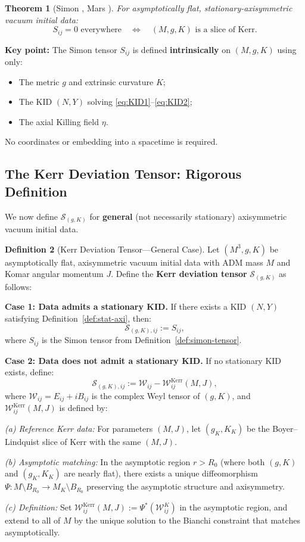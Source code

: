 \documentclass[12pt]{article}
\theoremstyle{plain}
\newtheorem{theorem}{Theorem}[section]
\theoremstyle{definition}
\newtheorem{definition}[theorem]{Definition}
\theoremstyle{remark}
\begin{document}
\begin{theorem}[Simon \cite{simon1984}, Mars \cite{mars1999}]\label{thm:simon-kerr}
For asymptotically flat, stationary-axisymmetric vacuum initial data:
\[
S_{ij} = 0 \text{ everywhere} \quad \Longleftrightarrow \quad (M, g, K) \text{ is a slice of Kerr}.
\]
\end{theorem}

\textbf{Key point:} The Simon tensor $S_{ij}$ is defined \textbf{intrinsically} on $(M, g, K)$ using only:
\begin{itemize}
    \item The metric $g$ and extrinsic curvature $K$;
    \item The KID $(N, Y)$ solving \eqref{eq:KID1}--\eqref{eq:KID2};
    \item The axial Killing field $\eta$.
\end{itemize}
No coordinates or embedding into a spacetime is required.

\subsection{The Kerr Deviation Tensor: Rigorous Definition}

We now define $\mathcal{S}_{(g,K)}$ for \textbf{general} (not necessarily stationary) axisymmetric vacuum initial data.

\begin{definition}[Kerr Deviation Tensor---General Case]\label{def:kerr-deviation-general}
Let $(M^3, g, K)$ be asymptotically flat, axisymmetric vacuum initial data with ADM mass $M$ and Komar angular momentum $J$. Define the \textbf{Kerr deviation tensor} $\mathcal{S}_{(g,K)}$ as follows:

\textbf{Case 1: Data admits a stationary KID.}
If there exists a KID $(N, Y)$ satisfying Definition~\ref{def:stat-axi}, then:
\[
\mathcal{S}_{(g,K),ij} := S_{ij},
\]
where $S_{ij}$ is the Simon tensor from Definition~\ref{def:simon-tensor}.

\textbf{Case 2: Data does not admit a stationary KID.}
If no stationary KID exists, define:
\begin{equation}\label{eq:kerr-deviation-nonstat}
\mathcal{S}_{(g,K),ij} := \mathcal{W}_{ij} - \mathcal{W}^{\mathrm{Kerr}}_{ij}(M, J),
\end{equation}
where $\mathcal{W}_{ij} = E_{ij} + iB_{ij}$ is the complex Weyl tensor of $(g, K)$, and $\mathcal{W}^{\mathrm{Kerr}}_{ij}(M, J)$ is defined by:

\textit{(a) Reference Kerr data:} For parameters $(M, J)$, let $(g_K, K_K)$ be the Boyer--Lindquist slice of Kerr with the same $(M, J)$.

\textit{(b) Asymptotic matching:} In the asymptotic region $r > R_0$ (where both $(g, K)$ and $(g_K, K_K)$ are nearly flat), there exists a unique diffeomorphism $\Psi: M \setminus B_{R_0} \to M_K \setminus B_{R_0}$ preserving the asymptotic structure and axisymmetry.

\textit{(c) Definition:} Set $\mathcal{W}^{\mathrm{Kerr}}_{ij}(M, J) := \Psi^*(\mathcal{W}^K_{ij})$ in the asymptotic region, and extend to all of $M$ by the unique solution to the Bianchi constraint that matches asymptotically.
\end{definition}
\end{document}
